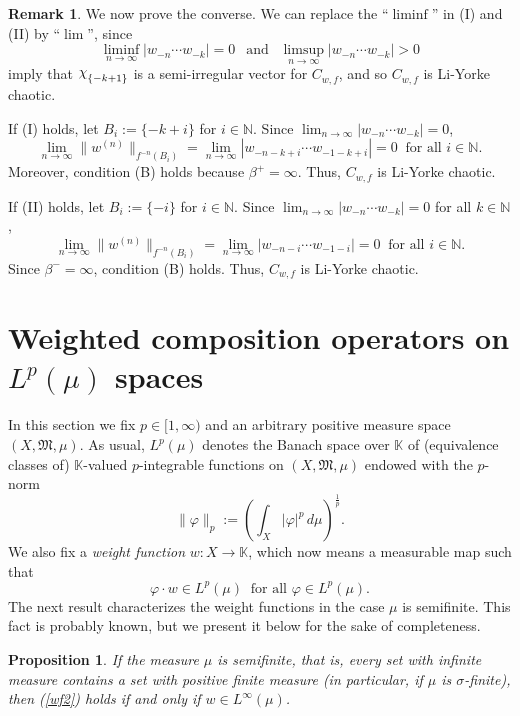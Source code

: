 \documentclass[12pt]{amsart}
\theoremstyle{theorem}
\newtheorem{proposition}[theorem]{Proposition}
\theoremstyle{definition}
\newtheorem{remark}[theorem]{Remark}
\theoremstyle{remark} \theoremstyle{question} \theoremstyle{example}
\newcommand{\N}{\mathbb{N}}
\newcommand{\K}{\mathbb{K}}
\newcommand{\fM}{\mathfrak{M}}
\DeclareRobustCommand{\rchi}{{\mathpalette\irchi\relax}}
\newcommand{\irchi}[2]{\raisebox{\depth}{$#1\chi$}}
\begin{document}
\begin{remark}
\smallskip
We now prove the converse. We can replace the ``$\liminf$'' in (I) and (II) by ``$\lim$'', since
\[
\liminf_{n \to \infty} |w_{-n} \cdots w_{-k}| = 0 \ \ \text{ and } \ \ \limsup_{n \to \infty} |w_{-n} \cdots w_{-k}| > 0
\]
imply that $\rchi_{\{-k+1\}}$ is a semi-irregular vector for $C_{w,f}$, and so $C_{w,f}$ is Li-Yorke chaotic.

\smallskip
If (I) holds, let $B_i\!:= \{-k+i\}$ for $i \in \N$. Since $\lim_{n \to \infty} |w_{-n} \cdots w_{-k}| = 0$,
\[
\lim_{n \to \infty} \|w^{(n)}\|_{f^{-n}(B_i)} = \lim_{n \to \infty} |w_{-n-k+i} \cdots w_{-1-k+i}| = 0 \ \text{ for all } i \in \N.
\]
Moreover, condition (B) holds because $\beta^+ = \infty$. Thus, $C_{w,f}$ is Li-Yorke chaotic. 

\smallskip
If (II) holds, let $B_i\!:= \{-i\}$ for $i \in \N$. Since $\lim_{n \to \infty} |w_{-n} \cdots w_{-k}| = 0$ for all $k \in \N$, 
\[
\lim_{n \to \infty} \|w^{(n)}\|_{f^{-n}(B_i)} = \lim_{n \to \infty} |w_{-n-i} \cdots w_{-1-i}| = 0 \ \text{ for all } i \in \N.
\]
Since $\beta^- = \infty$, condition (B) holds. Thus, $C_{w,f}$ is Li-Yorke chaotic. 
\end{remark}


\section{Weighted composition operators on $L^p(\mu)$ spaces}\label{Section3}

In this section we fix $p \in [1,\infty)$ and an arbitrary positive measure space $(X,\fM,\mu)$.
As usual, $L^p(\mu)$ denotes the Banach space over $\K$ of (equivalence classes of) $\K$-valued $p$-integrable functions on $(X,\fM,\mu)$ endowed with the $p$-norm 
\[
\|\varphi\|_p\!:= \left(\int_X |\varphi|^p\, d\mu\right)^\frac{1}{p}.
\]
We also fix a {\em weight function} $w : X \to \K$, which now means a measurable map such that
\begin{equation}\label{wf2}
\varphi \cdot w \in L^p(\mu) \ \text{ for all } \varphi \in L^p(\mu).
\end{equation}
The next result characterizes the weight functions in the case $\mu$ is semifinite.
This fact is probably known, but we present it below for the sake of completeness.

\begin{proposition}
If the measure $\mu$ is semifinite, that is, every set with infinite measure contains a set with positive finite measure 
(in particular, if $\mu$ is $\sigma$-finite), then (\ref{wf2}) holds if and only if $w \in L^\infty(\mu)$.
\end{proposition}
\end{document}
